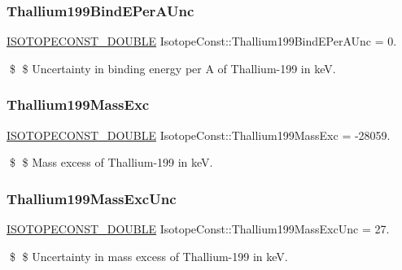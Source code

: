 \subsubsection{\texorpdfstring{Thallium199\+Bind\+E\+Per\+A\+Unc}{Thallium199BindEPerAUnc}}
{\footnotesize\ttfamily \mbox{\hyperlink{group___isotope_const-_macros_ga8f45a7272ce02c0b4c65c44636ed719a}{I\+S\+O\+T\+O\+P\+E\+C\+O\+N\+S\+T\+\_\+\+D\+O\+U\+B\+LE}} Isotope\+Const\+::\+Thallium199\+Bind\+E\+Per\+A\+Unc = 0.}

\$ \$ Uncertainty in binding energy per A of Thallium-\/199 in keV. \mbox{\label{group___isotope_const-_thallium-_tl199_ga53ec409c5145a21e5abb6d6cc4948608}} 
\subsubsection{\texorpdfstring{Thallium199\+Mass\+Exc}{Thallium199MassExc}}
{\footnotesize\ttfamily \mbox{\hyperlink{group___isotope_const-_macros_ga8f45a7272ce02c0b4c65c44636ed719a}{I\+S\+O\+T\+O\+P\+E\+C\+O\+N\+S\+T\+\_\+\+D\+O\+U\+B\+LE}} Isotope\+Const\+::\+Thallium199\+Mass\+Exc = -\/28059.}

\$ \$ Mass excess of Thallium-\/199 in keV. \mbox{\label{group___isotope_const-_thallium-_tl199_ga8fdd274c8c6d5f8411f91e9ddaed81db}} 
\subsubsection{\texorpdfstring{Thallium199\+Mass\+Exc\+Unc}{Thallium199MassExcUnc}}
{\footnotesize\ttfamily \mbox{\hyperlink{group___isotope_const-_macros_ga8f45a7272ce02c0b4c65c44636ed719a}{I\+S\+O\+T\+O\+P\+E\+C\+O\+N\+S\+T\+\_\+\+D\+O\+U\+B\+LE}} Isotope\+Const\+::\+Thallium199\+Mass\+Exc\+Unc = 27.}

\$ \$ Uncertainty in mass excess of Thallium-\/199 in keV. \mbox{\label{group___isotope_const-_thallium-_tl199_gad01951f7f10129d61e227a106e4b4d46}} 
